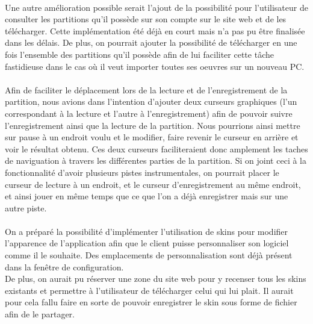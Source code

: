 \paragraph{}
Une autre amélioration possible serait l'ajout de la possibilité pour l'utilisateur de consulter les partitions qu'il possède sur son compte sur le site web et de les télécharger. Cette implémentation été déjà en court mais n'a pas pu être finalisée dans les délais.
De plus, on pourrait ajouter la possibilité de télécharger en une fois l'ensemble des partitions qu'il possède afin de lui faciliter cette tâche fastidieuse dans le cas où il veut importer toutes ses oeuvres sur un nouveau PC.

\paragraph{}
Afin de faciliter le déplacement lors de la lecture et de l'enregistrement de la partition, nous avions dans l'intention d'ajouter 
deux curseurs graphiques (l'un correspondant à la lecture et l'autre à l'enregistrement) afin de pouvoir suivre l'enregistrement ainsi que 
la lecture de la partition. Nous pourrions ainsi mettre sur pause à un endroit voulu et le modifier, faire revenir le curseur en arrière et 
voir le résultat obtenu. Ces deux curseurs faciliteraient donc amplement les taches de naviguation à travers les différentes parties de la partition. 
Si on joint ceci à la fonctionnalité d'avoir plusieurs pistes instrumentales, on pourrait placer le curseur de lecture à un endroit, et le curseur 
d'enregistrement au même endroit, et ainsi jouer en même temps que ce que l'on a déjà enregistrer mais sur une autre piste.

\paragraph{}
On a préparé la possibilité d'implémenter l'utilisation de skins pour modifier l'apparence de l'application afin que le client puisse personnaliser son logiciel comme il le souhaite. Des emplacements de personnalisation sont déjà présent dans la fenêtre de configuration.\\
De plus, on aurait pu réserver une zone du site web pour y recenser tous les skins existants et permettre à l'utilisateur de télécharger celui qui lui plait. 
Il aurait pour cela fallu faire en sorte de pouvoir enregistrer le skin sous forme de fichier afin de le partager. 
